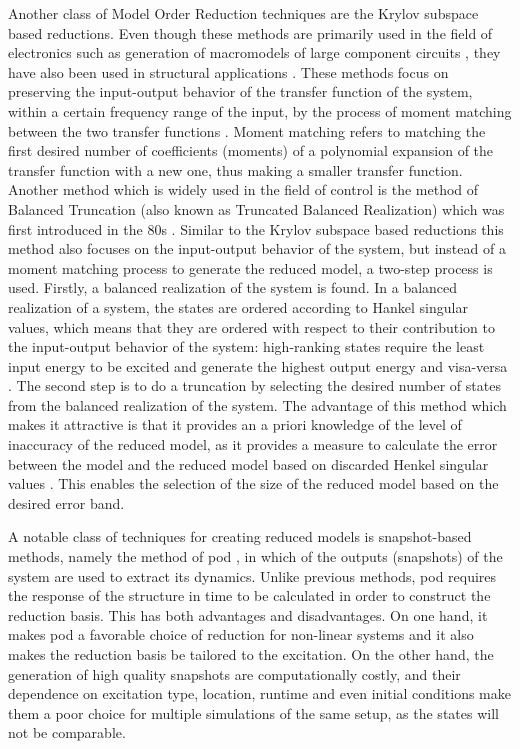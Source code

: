 Another class of Model Order Reduction techniques are the Krylov subspace based reductions. Even though these methods are primarily used in the field of electronics such as generation of macromodels of large component circuits \cite{freund_sprim_2004}, they have also been used in structural applications \cite{barbella_block_2011,bai_krylov_2002,lenhardt_krylov_1999}. These methods focus on preserving the input-output behavior of the transfer function of the system, within a certain frequency range of the input, by the process of moment matching between the two transfer functions \cite{besselink_comparison_2013}. Moment matching refers to matching the first desired number of coefficients (moments) of a polynomial expansion of the transfer function with a new one, thus making a smaller transfer function. Another method which is widely used in the field of control is the method of Balanced Truncation (also known as Truncated Balanced Realization) which was first introduced in the 80s \cite{moore_principal_1981}. Similar to the Krylov subspace based reductions this method also focuses on the input-output behavior of the system, but instead of a moment matching process to generate the reduced model, a two-step process is used. Firstly, a balanced realization of the system is found. In a balanced realization of a system, the states are ordered according to Hankel singular values, which means that they are ordered with respect to their contribution to the input-output behavior of the system: high-ranking states require the least input energy to be excited and generate the highest output energy and visa-versa \cite{antoulas_approximation_2009}. The second step is to do a truncation by selecting the desired number of states from the balanced realization of the system. The advantage of this method which makes it attractive is that it provides an a priori knowledge of the level of inaccuracy of the reduced model, as it provides a measure to calculate the error between the model and the reduced model based on discarded Henkel singular values \cite{schilders_model_2008}. This enables the selection of the size of the reduced model based on the desired error band.

A notable class of techniques for creating reduced models is snapshot-based methods, namely the method of \gls{pod} \cite{kerschen_method_2005}, in which  of the outputs (snapshots) of the system are used to extract its dynamics. Unlike previous methods, \gls{pod} requires the response of the structure in time to be calculated in order to construct the reduction basis. This has both advantages and disadvantages. On one hand, it makes \gls{pod} a favorable choice of reduction for non-linear systems \cite{xie_proper_2014} and it also makes the reduction basis be tailored to the excitation. On the other hand, the generation of high quality snapshots are computationally costly, and their dependence on excitation type, location, runtime and even initial conditions make them a poor choice for multiple simulations of the same setup, as the states will not be comparable.

